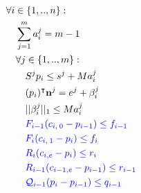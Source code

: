 \begin{align}
                            \quad & \forall i \in \{1,..,n\} : \nonumber\\
                                \quad & \quad \sum_{j=1}^{m} a_i^j = m-1  \nonumber\\
                                \quad & \quad \forall j \in \{1,..,m\} : \nonumber\\
                                    \quad & \quad \quad S^j p_i \leq s^j + M a_i^j  \nonumber\\
                                    \quad & \quad \quad (p_i)^{\intercal} \textbf{n}^j = e^j + \beta_i^j \nonumber\\
                                    \quad & \quad \quad ||\beta_i^j||_1 \leq M a_i^j \nonumber\\
                                    \quad & \quad \quad \textcolor{blue}{F_{i-1} (c_{i,\:0}-p_{i-1}) \leq  f_{i-1}} \nonumber\\
                                    \quad & \quad \quad \textcolor{blue}{F_{i} (c_{i,\:1}-p_{i}) \leq  f_{i}}  \nonumber\\
                                    \quad & \quad \quad \textcolor{blue}{R_{i} (c_{i,e} - p_{i}) \leq r_i}  \nonumber\\
                                    \quad & \quad \quad \textcolor{blue}{R_{i-1} (c_{i-1,e} - p_{i-1}) \leq r_{i-1}} \nonumber\\
                                    \quad & \quad \quad \textcolor{blue}{\mathcal{Q}_{i-1} (p_i - p_{i-1}) \leq q_{i-1}} \nonumber
\end{align}